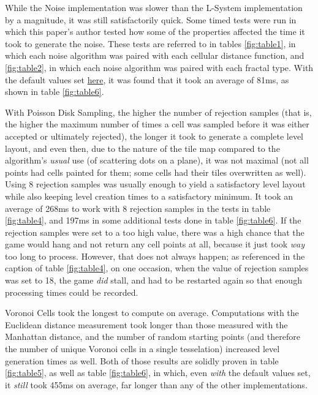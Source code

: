 While the Noise implementation was slower than the L-System implementation by a magnitude, it was still satisfactorily quick. Some timed tests were run in which this paper's author tested how some of the properties affected the time it took to generate the noise. These tests are referred to in tables \ref{fig:table1}, in which each noise algorithm was paired with each cellular distance function, and \ref{fig:table2}, in which each noise algorithm was paired with each fractal type. With the default values set \hyperref[noisedefaults]{here}, it was found that it took an average of 81ms, as shown in table \ref{fig:table6}.

With Poisson Disk Sampling, the higher the number of rejection samples (that is, the higher the maximum number of times a cell was sampled before it was either accepted or ultimately rejected), the longer it took to generate a complete level layout, and even then, due to the nature of the tile map compared to the algorithm's \textit{usual} use (of scattering dots on a plane), it was not maximal (not all points had cells painted for them; some cells had their tiles overwritten as well). Using 8 rejection samples was usually enough to yield a satisfactory level layout while also keeping level creation times to a satisfactory minimum. It took an average of 268ms to work with 8 rejection samples in the tests in table \ref{fig:table4}, and 197ms in some additional tests done in table \ref{fig:table6}. If the rejection samples were set to a too high value, there was a high  chance that the game would hang and not return any cell points at all, because it just took \textit{way} too long to process. However, that does not always happen; as referenced in the caption of table \ref{fig:table4}, on one occasion, when the value of rejection samples was set to 18, the game \textit{did} stall, and had to be restarted again so that enough processing times could be recorded.

Voronoi Cells took the longest to compute on average. Computations with the Euclidean distance measurement took longer than those measured with the Manhattan distance, and the number of random starting points (and therefore the number of unique Voronoi cells in a single tesselation) increased level generation times as well. Both of those results are solidly proven in table \ref{fig:table5}, as well as table \ref{fig:table6}, in which, even \textit{with} the default values set, it \textit{still} took 455ms on average, far longer than any of the other implementations.

